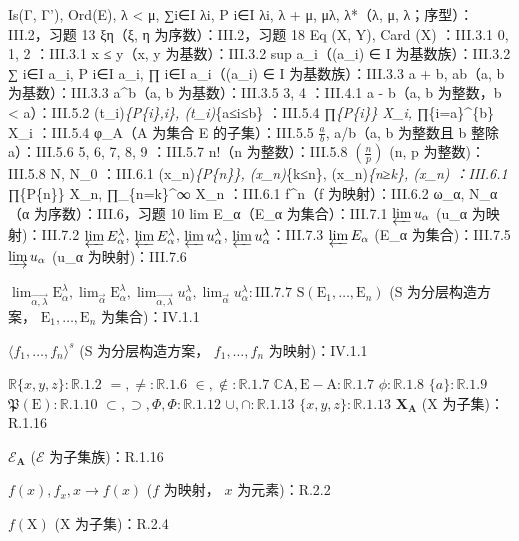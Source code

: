 Is(Γ, Γ'), Ord(E), λ \textless{} μ, ∑i∈I λi, P i∈I λi, λ + μ, μλ, λ*（λ, μ, λ；序型）：III.2，习题 13 ξη（ξ, η 为序数）：III.2，习题 18 Eq (X, Y), Card (X) ：III.3.1 0, 1, 2 ：III.3.1 x ≤ y（x, y 为基数）：III.3.2 sup a\_i（(a\_i) ∈ I 为基数族）：III.3.2 ∑ i∈I a\_i, P i∈I a\_i, ∏ i∈I a\_i（(a\_i) ∈ I 为基数族）：III.3.3 a + b, ab（a, b 为基数）：III.3.3 a\^{}b（a, b 为基数）：III.3.5 3, 4 ：III.4.1 a - b（a, b 为整数，b \textless{} a）：III.5.2 (t\_i)\emph{\{P\{i\},i\}, (t\_i)}\{a≤i≤b\} ：III.5.4 ∏\emph{\{P\{i\}\} X\_i, ∏}\{i=a\}\^{}\{b\} X\_i ：III.5.4 φ\_A（A 为集合 E 的子集）：III.5.5 \(\frac{a}{b}\), a/b（a, b 为整数且 b 整除 a）：III.5.6 5, 6, 7, 8, 9 ：III.5.7 n!（n 为整数）：III.5.8 \(\left(\frac{n}{p}\right)\) (n, p 为整数)：III.5.8 N, N\_0 ：III.6.1 (x\_n)\emph{\{P\{n\}\}, (x\_n)}\{k≤n\}, (x\_n)\emph{\{n≥k\}, (x\_n) ：III.6.1 ∏}\{P\{n\}\} X\_n, ∏\_\{n=k\}\^{}∞ X\_n ：III.6.1 f\^{}n（f 为映射）：III.6.2 ω\_α, N\_α（α 为序数）：III.6，习题 10 lim E\_α（E\_α 为集合）：III.7.1 \(\varprojlim u_\alpha\) (u\_α 为映射)：III.7.2 \(\varprojlim E_\alpha^\lambda\), \(\varprojlim E_\alpha^\lambda\), \(\varprojlim u_\alpha^\lambda\), \(\varprojlim u_\alpha^\lambda\)：III.7.3 \(\varprojlim E_\alpha\) (E\_α 为集合)：III.7.5 \(\varinjlim u_\alpha\) (u\_α 为映射)：III.7.6

\(\lim_{\overrightarrow{\alpha,\lambda}} \mathrm{E}_{\alpha}^{\lambda}, \lim_{\overrightarrow{\alpha}} \mathrm{E}_{\alpha}^{\lambda}, \lim_{\overrightarrow{\alpha,\lambda}} u_{\alpha}^{\lambda}, \lim_{\overrightarrow{\alpha}} u_{\alpha}^{\lambda}: \text{III.7.7}\) \(\mathrm{S}(\mathrm{E}_1, \ldots, \mathrm{E}_n)\) (S 为分层构造方案， \(\mathrm{E}_1, \ldots, \mathrm{E}_n\) 为集合)：IV.1.1

\(\langle f_1, \ldots, f_n \rangle^s\) (S 为分层构造方案， \(f_1, \ldots, f_n\) 为映射)：IV.1.1

\(\mathbb{R}\{x, y, z\} : \mathbb{R}.1.2\) \(= , \neq : \mathbb{R}.1.6\) \(\in , \notin : \mathbb{R}.1.7\) \(\mathbb{C}\mathrm{A}, \mathrm{E} - \mathrm{A}: \mathbb{R}.1.7\) \(\phi : \mathbb{R}.1.8\) \(\{a\} : \mathbb{R}.1.9\) \(\mathfrak{P}(\mathrm{E}) : \mathbb{R}.1.10\) \(\subset, \supset, \Phi, \Phi: \mathbb{R}.1.12\) \(\cup, \cap : \mathbb{R}.1.13\) \(\{x, y, z\} : \mathbb{R}.1.13\) \(\mathbf{X}_{\mathbf{A}}\) (X 为子集)：R.1.16

\(\mathcal{E}_{\mathbf{A}}\) (\(\mathcal{E}\) 为子集族)：R.1.16

\(f(x), f_x, x \to f(x)\) (\(f\) 为映射， \(x\) 为元素)：R.2.2

\(f(\mathrm{X})\) (X 为子集)：R.2.4

